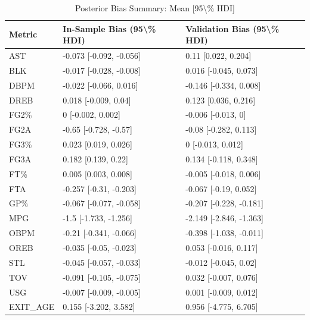 \begin{table}[t]
\caption*{
{\fontsize{20}{25}\selectfont  Posterior Bias Summary: Mean [95\textbackslash{}\% HDI]\fontsize{12}{15}\selectfont }
} 
\fontsize{12.0pt}{14.0pt}\selectfont
\begin{tabular*}{\linewidth}{@{\extracolsep{\fill}}lll}
\toprule
Metric & In-Sample Bias (95\textbackslash{}\% HDI) & Validation Bias (95\textbackslash{}\% HDI) \\ 
\midrule\addlinespace[2.5pt]
AST & -0.073 [-0.092, -0.056] & 0.11 [0.022, 0.204] \\ 
BLK & -0.017 [-0.028, -0.008] & 0.016 [-0.045, 0.073] \\ 
DBPM & -0.022 [-0.066, 0.016] & -0.146 [-0.334, 0.008] \\ 
DREB & 0.018 [-0.009, 0.04] & 0.123 [0.036, 0.216] \\ 
FG2\% & 0 [-0.002, 0.002] & -0.006 [-0.013, 0] \\ 
FG2A & -0.65 [-0.728, -0.57] & -0.08 [-0.282, 0.113] \\ 
FG3\% & 0.023 [0.019, 0.026] & 0 [-0.013, 0.012] \\ 
FG3A & 0.182 [0.139, 0.22] & 0.134 [-0.118, 0.348] \\ 
FT\% & 0.005 [0.003, 0.008] & -0.005 [-0.018, 0.006] \\ 
FTA & -0.257 [-0.31, -0.203] & -0.067 [-0.19, 0.052] \\ 
GP\% & -0.067 [-0.077, -0.058] & -0.207 [-0.228, -0.181] \\ 
MPG & -1.5 [-1.733, -1.256] & -2.149 [-2.846, -1.363] \\ 
OBPM & -0.21 [-0.341, -0.066] & -0.398 [-1.038, -0.011] \\ 
OREB & -0.035 [-0.05, -0.023] & 0.053 [-0.016, 0.117] \\ 
STL & -0.045 [-0.057, -0.033] & -0.012 [-0.045, 0.02] \\ 
TOV & -0.091 [-0.105, -0.075] & 0.032 [-0.007, 0.076] \\ 
USG & -0.007 [-0.009, -0.005] & 0.001 [-0.009, 0.012] \\ 
EXIT\_AGE & 0.155 [-3.202, 3.582] & 0.956 [-4.775, 6.705] \\ 
\bottomrule
\end{tabular*}
\end{table}

